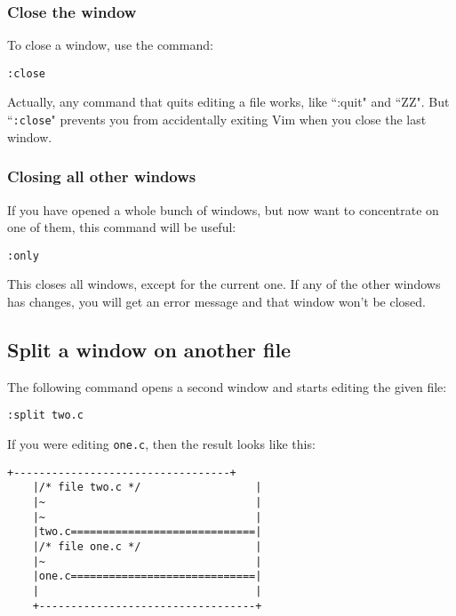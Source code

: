 \subsubsection{Close the window}
To close a window, use the command:

 \begin{Verbatim}[samepage=true]
 :close
 \end{Verbatim}

Actually, any command that quits editing a file works, like ``:quit" and ``ZZ".
But ``\texttt{:close}" prevents you from accidentally exiting Vim when you close the last window.

\subsubsection{Closing all other windows}

If you have opened a whole bunch of windows, but now want to concentrate on one of them, this command will be useful:

 \begin{Verbatim}[samepage=true]
 :only
 \end{Verbatim}

This closes all windows, except for the current one.
If any of the other windows has changes, you will get an error message and that window won't be closed.

\subsection{Split a window on another file}
The following command opens a second window and starts editing the given file:

 \begin{Verbatim}[samepage=true]
 :split two.c
 \end{Verbatim}

If you were editing \texttt{one.c}, then the result looks like this:

\begin{Verbatim}[samepage=true]
    +----------------------------------+
    |/* file two.c */                  |
    |~                                 |
    |~                                 |
    |two.c=============================|
    |/* file one.c */                  |
    |~                                 |
    |one.c=============================|
    |                                  |
    +----------------------------------+
\end{Verbatim}

